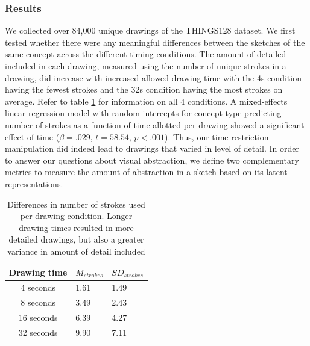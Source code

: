 \documentclass[10pt,letterpaper]{article}
\begin{document}
\subsubsection{Results}
We collected over 84,000 unique drawings of the THINGS128 dataset. We first tested whether there were any meaningful differences between the sketches of the same concept across the different timing conditions.
The amount of detailed included in each drawing, measured using the number of unique strokes in a drawing, did increase with increased allowed drawing time with the 4s condition having the fewest strokes and the 32s condition having the most strokes on average. Refer to table \ref{tab:strokes} for information on all 4 conditions.
A mixed-effects linear regression model with random intercepts for concept type predicting number of strokes as a function of time allotted per drawing showed a significant effect of time ($\beta=.029$, $t=58.54$, $p<.001$). Thus, our time-restriction manipulation did indeed lead to drawings that varied in level of detail. In order to answer our questions about visual abstraction, we define two complementary metrics to measure the amount of abstraction in a sketch based on its latent representations. 

\begin{table}[h!]
    \centering
    \begin{tabular}{c|l l}
        Drawing time & $M_{strokes}$ & $SD_{strokes}$\\
         \toprule
        4 seconds & 1.61 & 1.49\\
        8 seconds & 3.49 & 2.43\\
        16 seconds & 6.39 & 4.27\\
        32 seconds & 9.90 & 7.11\\
        \bottomrule 
    \end{tabular}
    \caption{Differences in number of strokes used per drawing condition. Longer drawing times resulted in more detailed drawings, but also a greater variance in amount of detail included }
    \label{tab:strokes}
\end{table}
\end{document}
